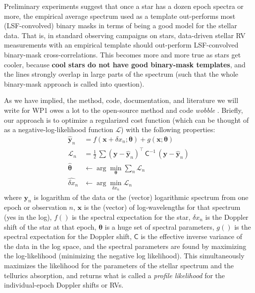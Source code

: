 \documentclass[12pt]{article}
\begin{document}
Preliminary experiments suggest that once a star has a dozen epoch spectra or more, the empirical average spectrum used as a template out-performs most (LSF-convolved) binary masks in terms of being a good model for the stellar data.
That is, in standard observing campaigns on stars, data-driven stellar RV measurements with an empirical template should out-perform LSF-convolved binary-mask cross-correlations.
This becomes more and more true as stars get cooler, because \textbf{cool stars do not have good binary-mask templates}, and the lines strongly overlap in large parts of the spectrum (such that the whole binary-mask approach is called into question).

As we have implied, the method, code, documentation, and literature we will write for WP1 owes a lot to the open-source method and code \textsl{wobble} \cite{Bedell2019}.
Briefly, our approach is to optimize a regularized cost function (which can be thought of as a negative-log-likelihood function $\mathcal{L}$) with the following properties:
\begin{align}
    \hat{\boldsymbol{y}}_n & = f (\boldsymbol{x} + \delta x_n; \boldsymbol{\theta}) + g(\boldsymbol{x}; \boldsymbol{\theta}) \\
    \mathcal{L}_n & = \frac{1}{2}\,\sum (\boldsymbol{y} - \hat{\boldsymbol{y}}_n)^\top\,\mathsf{C}^{-1}\,(\boldsymbol{y} - \hat{\boldsymbol{y}}_n) \\
    \hat{\boldsymbol{\theta}} &\leftarrow \arg\min_{\boldsymbol{\theta}}\sum_n\mathcal{L}_n \\
    \hat{\delta x}_n &\leftarrow \arg\min_{\delta x_n}\mathcal{L}_n
\end{align}
where $\boldsymbol{y}_n$ is logarithm of the data or the (vector) logarithmic spectrum from one epoch or observation $n$,
$\boldsymbol{x}$ is the (vector) of log-wavelengths for that spectrum (yes in the log),
$f()$ is the spectral expectation for the star,
$\delta x_n$ is the Doppler shift of the star at that epoch,
$\boldsymbol{\theta}$ is a huge set of spectral parameters,
$g()$ is the spectral expectation for the Doppler shift,
$\mathsf{C}$ is the effective inverse variance of the data in the log space,
and the spectral parameters are found by maximizing the log-likelihood (minimizing the negative log likelihood).
This simultaneously maximizes the likelihood for the parameters of the stellar spectrum and the tellurics absorption, and returns what is called a \emph{profile likelihood} for the individual-epoch Doppler shifts or RVs.
\end{document}
